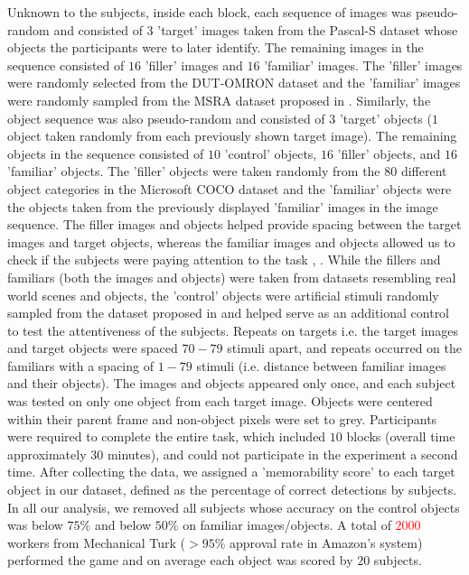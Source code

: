 Unknown to the subjects, inside each block, each sequence of images was pseudo-random and consisted of $3$ 'target' images taken from the Pascal-S dataset whose objects the participants were to later identify. The remaining images in the sequence consisted of $16$ 'filler' images and $16$ 'familiar' images. The 'filler' images were randomly selected from the DUT-OMRON dataset \cite{dutomron13} and the 'familiar' images were randomly sampled from the MSRA dataset proposed in \cite{msra11}. Similarly, the object sequence was also pseudo-random and consisted of $3$ 'target' objects ($1$ object taken randomly from each previously shown target image). The remaining objects in the sequence consisted of $10$ 'control' objects, $16$ 'filler' objects, and $16$ 'familiar' objects. The 'filler' objects were taken randomly from the $80$ different object categories in the Microsoft COCO dataset \cite{coco14} and the 'familiar' objects were the objects taken from the previously displayed 'familiar' images in the image sequence. The filler images and objects helped provide spacing between the target images and target objects, whereas the familiar images and objects allowed us to check if the subjects were paying attention to the task \cite{brady08}, \cite{isola11}. While the fillers and familiars (both the images and objects) were taken from datasets resembling real world scenes and objects, the 'control' objects were artificial stimuli randomly sampled from the dataset proposed in \cite{brady08} and helped serve as an additional control to test the attentiveness of the subjects. Repeats on targets i.e. the target images and target objects were spaced $70-79$ stimuli apart, and repeats occurred on the familiars with a spacing of $1-79$ stimuli (i.e. distance between familiar images and their objects). The images and objects appeared only once, and each subject was tested on only one object from each target image. Objects were centered within their parent frame and non-object pixels were set to grey. Participants were required to complete the entire task, which included $10$ blocks (overall time approximately $30$ minutes), and could not participate in the experiment a second time. After collecting the data, we assigned a 'memorability score' to each target object in our dataset, defined as the percentage of correct detections by subjects. In all our analysis, we removed all subjects whose accuracy on the control objects was below $75\%$ and below $50\%$ on familiar images/objects. A total of \textcolor{red}{$2000$} workers from Mechanical Turk ($> 95\%$ approval rate in Amazon’s system) performed the game and on average each object was scored by $20$ subjects. 
